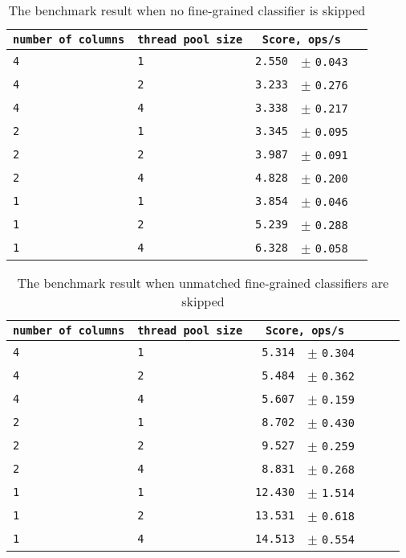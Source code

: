 \begin{table}[htbp]
  \begin{tabular}{l|l|l|rl}
  \texttt{number of columns} & \texttt{thread pool size} & \multicolumn{2}{c}{\texttt{Score, ops/s}} \\
  \hline
  \texttt{4} & \texttt{1} & \texttt{2.550} & \scriptsize $\pm$ \texttt{0.043}  \\
  \texttt{4} & \texttt{2} & \texttt{3.233} & \scriptsize $\pm$ \texttt{0.276}  \\
  \texttt{4} & \texttt{4} & \texttt{3.338} & \scriptsize $\pm$ \texttt{0.217}  \\
  \texttt{2} & \texttt{1} & \texttt{3.345} & \scriptsize $\pm$ \texttt{0.095}  \\
  \texttt{2} & \texttt{2} & \texttt{3.987} & \scriptsize $\pm$ \texttt{0.091}  \\
  \texttt{2} & \texttt{4} & \texttt{4.828} & \scriptsize $\pm$ \texttt{0.200}  \\
  \texttt{1} & \texttt{1} & \texttt{3.854} & \scriptsize $\pm$ \texttt{0.046}  \\
  \texttt{1} & \texttt{2} & \texttt{5.239} & \scriptsize $\pm$ \texttt{0.288}  \\
  \texttt{1} & \texttt{4} & \texttt{6.328} & \scriptsize $\pm$ \texttt{0.058}  \\
  \end{tabular}
  \caption{The benchmark result when no fine-grained classifier is skipped}
  \label{The benchmark result when no fine-grained classifier is skipped}
\end{table}

\begin{table}[htbp]
  \begin{tabular}{l|l|l|l|l|rl}
  \texttt{number of columns} & \texttt{thread pool size} & \multicolumn{2}{c}{\texttt{Score, ops/s}} \\
  \hline
  \texttt{4} & \texttt{1} & \texttt{ 5.314} & \scriptsize $\pm$ \texttt{0.304}  \\
  \texttt{4} & \texttt{2} & \texttt{ 5.484} & \scriptsize $\pm$ \texttt{0.362}  \\
  \texttt{4} & \texttt{4} & \texttt{ 5.607} & \scriptsize $\pm$ \texttt{0.159}  \\
  \texttt{2} & \texttt{1} & \texttt{ 8.702} & \scriptsize $\pm$ \texttt{0.430}  \\
  \texttt{2} & \texttt{2} & \texttt{ 9.527} & \scriptsize $\pm$ \texttt{0.259}  \\
  \texttt{2} & \texttt{4} & \texttt{ 8.831} & \scriptsize $\pm$ \texttt{0.268}  \\
  \texttt{1} & \texttt{1} & \texttt{12.430} & \scriptsize $\pm$ \texttt{1.514}  \\
  \texttt{1} & \texttt{2} & \texttt{13.531} & \scriptsize $\pm$ \texttt{0.618}  \\
  \texttt{1} & \texttt{4} & \texttt{14.513} & \scriptsize $\pm$ \texttt{0.554}  \\
  \end{tabular}
  \caption{The benchmark result when unmatched fine-grained classifiers are skipped}
  \label{The benchmark result when unmatched fine-grained classifiers are skipped}
\end{table}

